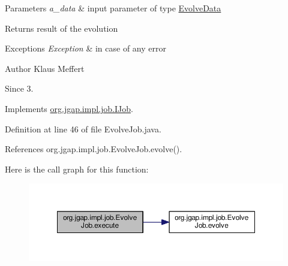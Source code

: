 \begin{DoxyParams}{Parameters}
{\em a\-\_\-data} & input parameter of type \hyperlink{classorg_1_1jgap_1_1impl_1_1job_1_1_evolve_data}{Evolve\-Data} \\
\hline
\end{DoxyParams}
\begin{DoxyReturn}{Returns}
result of the evolution
\end{DoxyReturn}

\begin{DoxyExceptions}{Exceptions}
{\em Exception} & in case of any error\\
\hline
\end{DoxyExceptions}
\begin{DoxyAuthor}{Author}
Klaus Meffert 
\end{DoxyAuthor}
\begin{DoxySince}{Since}
3. 
\end{DoxySince}


Implements \hyperlink{interfaceorg_1_1jgap_1_1impl_1_1job_1_1_i_job_a5318a1ce0e973553131c3cb268c8b3f2}{org.\-jgap.\-impl.\-job.\-I\-Job}.



Definition at line 46 of file Evolve\-Job.\-java.



References org.\-jgap.\-impl.\-job.\-Evolve\-Job.\-evolve().



Here is the call graph for this function\-:
\nopagebreak
\begin{figure}[H]
\begin{center}
\leavevmode
\includegraphics[width=350pt]{classorg_1_1jgap_1_1impl_1_1job_1_1_evolve_job_a15941e3a369e59b86a5688181875204d_cgraph}
\end{center}
\end{figure}




